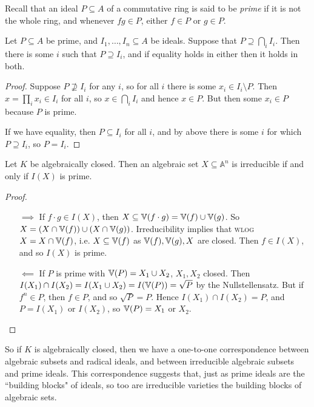 \documentclass[10pt,a4paper,rgb]{article}
\begin{document}
Recall that an ideal $P \subseteq A$ of a commutative ring is said to be \emph{prime} if it is not the whole ring, and whenever $fg \in P$, either $f \in P$ or $g \in P$.

\begin{lemma}
Let $P \subseteq A$ be prime, and $I_1, \ldots, I_n \subseteq A$ be ideals. Suppose that $P \supseteq \bigcap_i I_i$. Then there is some $i$ such that $P \supseteq I_i$, and if equality holds in either then it holds in both.
\end{lemma}
\begin{proof}
Suppose $P \nsupseteq I_i$ for any $i$, so for all $i$ there is some $x_i \in I_i \setminus P$. Then $x = \prod_i x_i \in I_i$ for all $i$, so $x \in \bigcap_i I_i$ and hence $x \in P$. But then some $x_i \in P$ because $P$ is prime. \contr

If we have equality, then $P \subseteq I_i$ for all $i$, and by above there is some $i$ for which $P \supseteq I_i$, so $P = I_i$.
\end{proof}

\begin{proposition}
Let $K$ be algebraically closed. Then an algebraic set $X \subseteq \mathbb{A}^n$ is irreducible if and only if $I(X)$ is prime.
\end{proposition}
\begin{proof}
\item
\begin{itemize}
\item[$\implies$] If $f\cdot g \in I(X)$, then $X \subseteq \mathbb{V}(f\cdot g) = \mathbb{V}(f) \cup \mathbb{V}(g)$. So $X = (X \cap \mathbb{V}(f)) \cup (X \cap \mathbb{V}(g))$. Irreducibility implies that \textsc{wlog} $X = X\cap \mathbb{V}(f)$, i.e. $X \subseteq \mathbb{V}(f)$ as $\mathbb{V}(f), \mathbb{V}(g), X$ are closed. Then $f \in I(X)$, and so $I(X)$ is prime.

\item[$\impliedby$] If $P$ is prime with $\mathbb{V}(P) = X_1 \cup X_2$, $X_1, X_2$ closed. Then $I(X_1) \cap I(X_2) = I(X_1\cup X_2) = I(\mathbb{V}(P)) = \sqrt{P}$ by the Nullstellensatz. But if $f^n \in P$, then $f \in P$, and so $\sqrt{P} = P$. Hence $I(X_1)\cap I(X_2) = P$, and $P = I(X_1)$ or $I(X_2)$, so $\mathbb{V}(P) = X_1$ or $X_2$.
\end{itemize}
\end{proof}
So if $K$ is algebraically closed, then we have a one-to-one correspondence between algebraic subsets and radical ideals, and between irreducible algebraic subsets and prime ideals. This correspondence suggests that, just as prime ideals are the ``building blocks" of ideals, so too are irreducible varieties the building blocks of algebraic sets.
\end{document}
